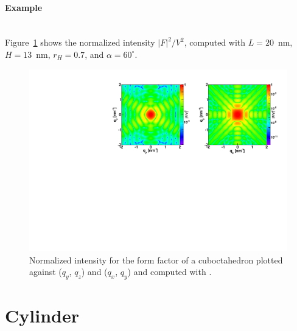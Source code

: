 \paragraph{Example}\mbox{}\\
Figure~\ref{fig:FFcuboctahEx} shows the normalized intensity $|F|^2/V^2$, computed with $L=20$~nm, $H=13$~nm, $r_H=0.7$, and $\alpha=60^{\circ}$.
\begin{figure}[ht]
\begin{center}
\includegraphics[angle=-90,width=\textwidth]{Figures/ff/figffcuboctah.pdf}
\end{center}
\caption{Normalized intensity for the form factor of a cuboctahedron plotted against ($q_y$, $q_z$) and  ($q_x$, $q_y$) and computed with .}
\label{fig:FFcuboctahEx}
\end{figure}



\newpage
\section{Cylinder} 
 
